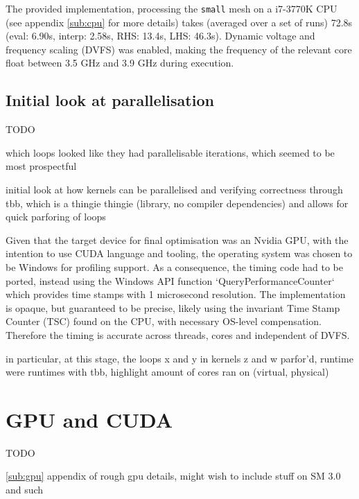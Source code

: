 \documentclass[11pt, oneside, a4paper]{article}
\begin{document}
The provided implementation, processing the \texttt{small} mesh on a i7-3770K CPU (see appendix \ref{sub:cpu} for more details) takes (averaged over a set of runs) 72.8s (eval: 6.90s, interp: 2.58s, RHS: 13.4s, LHS: 46.3s). Dynamic voltage and frequency scaling (DVFS) was enabled, making the frequency of the relevant core float between 3.5 GHz and 3.9 GHz during execution.


\subsection{Initial look at parallelisation} %
\label{sub:initial_look_at_parallelisation}

TODO

which loops looked like they had parallelisable iterations, which seemed to be most prospectful

initial look at how kernels can be parallelised and verifying correctness through tbb, which is a thingie thingie (library, no compiler dependencies)
and allows for quick parforing of loops


Given that the target device for final optimisation was an Nvidia GPU, with the intention to use CUDA language and tooling, the operating system was chosen to be Windows for profiling support. As a consequence, the timing code had to be ported, instead using the Windows API function `QueryPerformanceCounter` which provides time stamps with 1 microsecond resolution. The implementation is opaque, but guaranteed to be precise, likely using the invariant Time Stamp Counter (TSC) found on the CPU, with necessary OS-level compensation. Therefore the timing is accurate across threads, cores and independent of DVFS.


in particular, at this stage, the loops x and y in kernels z and w parfor'd, runtime were
runtimes with tbb, highlight amount of cores ran on (virtual, physical)




\section{GPU and CUDA} %
\label{sec:gpu_and_cuda}

TODO

\ref{sub:gpu} appendix of rough gpu details, might wish to include stuff on SM 3.0 and such
\end{document}
